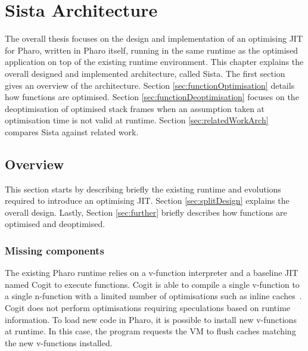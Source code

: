 \documentclass[a4paper,12pt,twoside]{../includes/ThesisStyle}
\begin{document}
\fi

\chapter{Sista Architecture}
\label{chap:architecture}
\minitoc

The overall thesis focuses on the design and implementation of an optimising JIT for Pharo, written in Pharo itself, running in the same runtime as the optimised application on top of the existing runtime environment. This chapter explains the overall designed and implemented architecture, called Sista. The first section gives an overview of the architecture. Section \ref{sec:functionOptimisation} details how functions are optimised. Section \ref{sec:functionDeoptimisation} focuses on the deoptimisation of optimised stack frames when an assumption taken at optimisation time is not valid at runtime. Section \ref{sec:relatedWorkArch} compares Sista against related work.


\section{Overview}

This section starts by describing briefly the existing runtime and evolutions required to introduce an optimising JIT. Section \ref{sec:splitDesign} explains the overall design. Lastly, Section \ref{sec:further} briefly describes how functions are optimised and deoptimised. 

\subsection{Missing components}

The existing Pharo runtime relies on a v-function interpreter and a baseline JIT named Cogit to execute functions. Cogit is able to compile a single v-function to a single n-function with a limited number of optimisations such as inline caches~\cite{Deut84a,Holz91a}. Cogit does not perform optimisations requiring speculations based on runtime information. To load new code in Pharo, it is possible to install new v-functions at runtime. In this case, the program requests the VM to flush caches matching the new v-functions installed.
\end{document}
